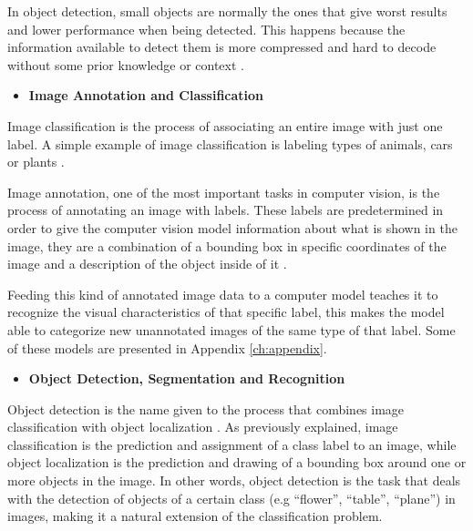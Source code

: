     \par In object detection, small objects are normally the ones that give  worst results and lower performance when being detected. This happens because the information available to detect them is more compressed and hard to decode without some prior knowledge or context \cite{Agarwal2019}.


\begin{itemize}
    \item \textbf{Image Annotation and Classification}
\end{itemize}

    Image classification is the process of associating an entire image with just one label. A simple example of image classification is labeling types of animals, cars or plants \cite{Feng2019}. \par
    Image annotation, one of the most important tasks in computer vision, is the process of annotating an image with labels. These labels are predetermined in order to give the computer vision model information about what is shown in the image, they are a combination of a bounding box in specific coordinates of the image  and a description of the object inside of it \cite{annotation}. \par

    Feeding this kind of annotated image data to a computer model teaches it to recognize the visual characteristics of that specific label, this makes the model able to categorize new unannotated images of the same type of that label. Some of these models are presented in Appendix \ref{ch:appendix}.

    \begin{itemize}
        \item \textbf{Object Detection, Segmentation and Recognition}
    \end{itemize}
    

    \par Object detection is the name given to the process that combines image classification with object localization \cite{ObjectDetection}. As previously explained, image classification is the prediction and assignment of a class label to an image, while object localization is the prediction and drawing of a bounding box around one or more objects in the image. In other words, object detection is the task that deals with the detection of objects of a certain class (e.g \enquote{flower}, \enquote{table}, \enquote{plane}) in images, making it a natural extension of the classification problem. 

